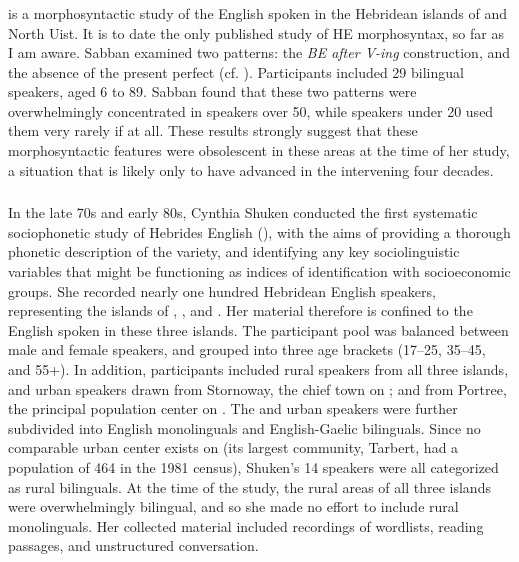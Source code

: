 \documentclass[output=paper,colorlinks,citecolor=brown]{langscibook}
\begin{document}
\subsubsection{\citet{Sabban:1985}}

\citet{Sabban:1985} is a morphosyntactic study of the English spoken in the Hebridean islands of  and North Uist. It is to date the only published study of HE morphosyntax, so far as I am aware. Sabban examined two patterns: the \textit{BE after V-ing} construction, and the absence of the present perfect (cf. ). Participants included 29 bilingual speakers, aged 6 to 89. Sabban found that these two patterns were overwhelmingly concentrated in speakers over 50, while speakers under 20 used them very rarely if at all. These results strongly suggest that these morphosyntactic features were obsolescent in these areas at the time of her study, a situation that is likely only to have advanced in the intervening four decades. 


\subsubsection{\citet{Shuken:1984, Shuken:1985, Shuken:1986}}

In the late 70s and early 80s, Cynthia Shuken conducted the first systematic sociophonetic study of Hebrides English (\citeyear{Shuken:1984, Shuken:1985, Shuken:1986}), with the aims of providing a thorough phonetic description of the variety, and identifying any key sociolinguistic variables that might be functioning as indices of identification with socioeconomic groups. She recorded nearly one hundred Hebridean English speakers, representing the islands of , , and . Her material therefore is confined to the English spoken in these three islands. The participant pool was balanced between male and female speakers, and grouped into three age brackets (17--25, 35--45, and 55+). In addition, participants included rural speakers from all three islands, and urban speakers drawn from Stornoway, the chief town on ; and from Portree, the principal population center on . The  and  urban speakers were further subdivided into English monolinguals and English-Gaelic bilinguals. Since no comparable urban center exists on  (its largest community, Tarbert, had a population of 464 in the 1981 census), Shuken’s 14  speakers were all categorized as rural bilinguals. At the time of the study, the rural areas of all three islands were overwhelmingly bilingual, and so she made no effort to include rural monolinguals. Her collected material included recordings of wordlists, reading passages, and unstructured conversation. 
\end{document}
